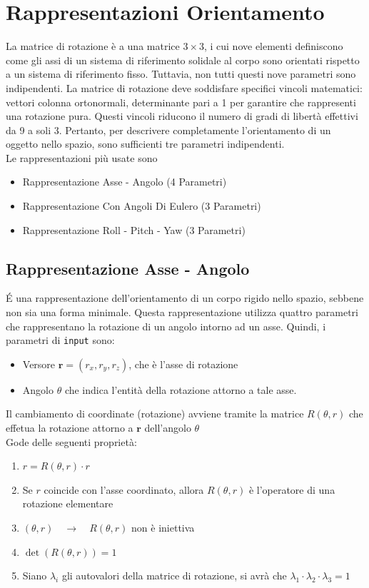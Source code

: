 ﻿\documentclass[11pt, a4paper]{article}
\begin{document}
\newpage
\section{Rappresentazioni Orientamento}
La matrice di rotazione è a una matrice $3 \times 3$, i cui nove elementi definiscono come gli assi di un sistema di riferimento solidale al corpo sono orientati rispetto a un sistema di riferimento fisso. Tuttavia, non tutti questi nove parametri sono indipendenti. La matrice di rotazione deve soddisfare specifici vincoli matematici: vettori colonna ortonormali, determinante pari a 1 per garantire che rappresenti una rotazione pura. Questi vincoli riducono il numero di gradi di libertà effettivi da 9 a soli 3. Pertanto, per descrivere completamente l'orientamento di un oggetto nello spazio, sono sufficienti tre parametri indipendenti.\\
Le rappresentazioni più usate sono
\begin{itemize}
    \item Rappresentazione Asse - Angolo (4 Parametri)
    \item Rappresentazione Con Angoli Di Eulero (3 Parametri)
    \item Rappresentazione Roll - Pitch - Yaw (3 Parametri)
\end{itemize}

\subsection{Rappresentazione Asse - Angolo}
É una rappresentazione dell'orientamento di un corpo rigido nello spazio, sebbene non sia una forma minimale. Questa rappresentazione utilizza quattro parametri che rappresentano la rotazione di un angolo intorno ad un asse. Quindi, i parametri di \texttt{input} sono:
\begin{itemize}
    \item Versore \(\mathbf{r} = (r_x, r_y, r_z)\), che è l'asse di rotazione
    \item Angolo \(\theta\) che indica l'entità della rotazione attorno a tale asse.
\end{itemize}
Il cambiamento di coordinate (rotazione) avviene tramite la matrice $R(\theta, r)$ che effetua la rotazione attorno a \(\mathbf{r}\) dell'angolo \(\theta\)\\
Gode delle seguenti proprietà:
\begin{enumerate}
    \item \(r = R(\theta, r) \cdot r\)
    \item Se \(r\) coincide con l'asse coordinato, allora \(R(\theta, r)\) è l'operatore di una rotazione elementare
    \item \((\theta, r) \quad \longrightarrow \quad R(\theta, r)\) non è iniettiva
    \item \(\det(R(\theta, r)) = 1\)
    \item Siano $\lambda_{i}$ gli autovalori della matrice di rotazione, si avrà che \(\lambda_{1} \cdot \lambda_{2} \cdot \lambda_{3} = 1\)
\end{enumerate}
\end{document}
